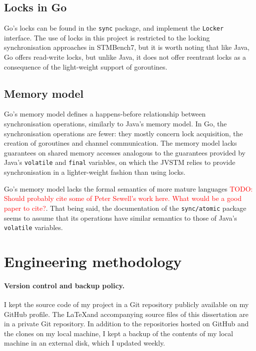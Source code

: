 \documentclass[12pt,a4paper,oneside,openright]{report}
\newcommand{\todo}[1]{\textcolor{red}{TODO: #1}}
\newcommand{\javaCode}[1]{\texttt{#1}}
\newcommand{\goCode}[1]{\texttt{#1}}
\newcommand{\goType}[1]{\texttt{#1}}
\begin{document}
\subsection{Locks in Go}
\label{sec:prep:locks-go}

Go's locks can be found in the \goCode{sync} package, and implement
the \goType{Locker} interface. The use of locks in this project is
restricted to the locking synchronisation approaches in STMBench7, but
it is worth noting that like Java, Go offers read-write locks, but
unlike Java, it does not offer reentrant locks as a consequence of the
light-weight support of goroutines.

\subsection{Memory model}
\label{sec:prep:memory-model}

Go's memory model defines a happens-before relationship between
synchronisation operations, similarly to Java's memory model. In Go,
the synchronisation operations are fewer: they mostly concern lock
acquisition, the creation of goroutines and channel communication. The
memory model lacks guarantees on shared memory accesses analogous to
the guarantees provided by Java's \javaCode{volatile} and
\javaCode{final} variables, on which the JVSTM relies to provide
synchronisation in a lighter-weight fashion than using locks.

Go's memory model lacks the formal semantics of more mature languages
\todo{Should probably cite some of Peter Sewell's work here. What
  would be a good paper to cite?}. That being said, the documentation
of the \goCode{sync/atomic} package seems to assume that its
operations have similar semantics to those of Java's
\javaCode{volatile} variables.

\section{Engineering methodology}
\label{sec:engin-meth}

\paragraph{Version control and backup policy.} I kept the source code
of my project in a Git repository publicly available on my GitHub
profile. The \LaTeX and accompanying source files of this dissertation
are in a private Git repository. In addition to the repositories
hosted on GitHub and the clones on my local machine, I kept a backup
of the contents of my local machine in an external disk, which I
updated weekly.
\end{document}
